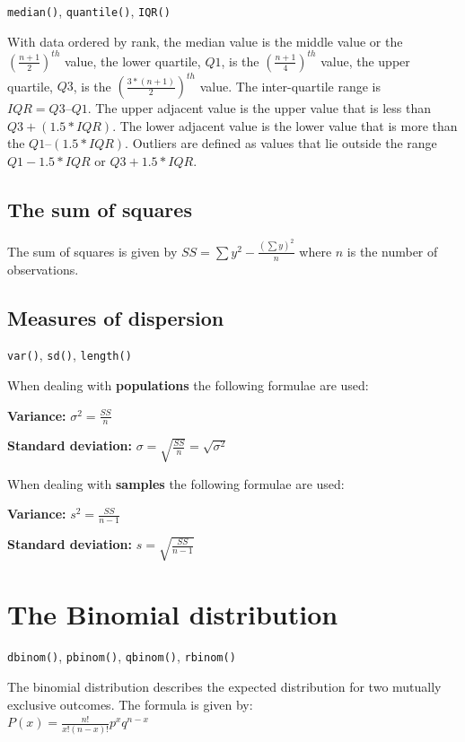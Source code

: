 \documentclass[
  11pt,
  a4paper,
]{book}
\begin{document}
\texttt{median()}, \texttt{quantile()}, \texttt{IQR()}

With data ordered by rank, the median value is the middle value or the \((\frac{n+1}{2})^{th}\) value, the lower quartile, \(Q1\), is the \((\frac{n+1}{4})^{th}\) value, the upper quartile, \(Q3\), is the \((\frac{3*(n+1)}{2})^{th}\) value. The inter-quartile range is \(IQR = Q3 – Q1\). The upper adjacent value is the upper value that is less than \(Q3 + (1.5 * IQR)\). The lower adjacent value is the lower value that is more than the \(Q1 – (1.5 * IQR)\). Outliers are defined as values that lie outside the range \(Q1 - 1.5*IQR\) or \(Q3 + 1.5*IQR\).

\hypertarget{the-sum-of-squares}{%
\subsection{The sum of squares}\label{the-sum-of-squares}}

The sum of squares is given by \(SS = \sum{y^2} - \frac{(\sum{y})^2}{n}\) where \(n\) is the number of observations.

\hypertarget{measures-of-dispersion}{%
\subsection{Measures of dispersion}\label{measures-of-dispersion}}

\texttt{var()}, \texttt{sd()}, \texttt{length()}

When dealing with \textbf{populations} the following formulae are used:

\textbf{Variance:} \(\sigma^2 = \frac{SS}{n}\)

\textbf{Standard deviation:} \(\sigma = \sqrt{\frac{SS}{n}} = \sqrt{\sigma^2}\)

When dealing with \textbf{samples} the following formulae are used:

\textbf{Variance:} \(s^2 = \frac{SS}{n-1}\)

\textbf{Standard deviation:} \(s = \sqrt{\frac{SS}{n-1}}\)

\hypertarget{the-binomial-distribution-2}{%
\section{The Binomial distribution}\label{the-binomial-distribution-2}}

\texttt{dbinom()}, \texttt{pbinom()}, \texttt{qbinom()}, \texttt{rbinom()}

The binomial distribution describes the expected distribution for two mutually exclusive outcomes. The formula is given by:\\
\(P(x) = \frac{n!}{x!(n-x)!} p^x q^{n-x}\)
\end{document}
